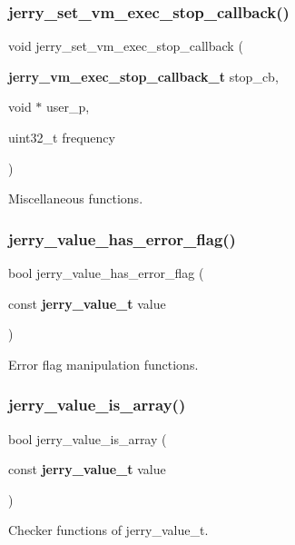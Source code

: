 \subsubsection{jerry\_set\_vm\_exec\_stop\_callback()}
{\footnotesize\ttfamily void jerry\+\_\+set\+\_\+vm\+\_\+exec\+\_\+stop\+\_\+callback (\begin{DoxyParamCaption}\item[{\textbf{ jerry\+\_\+vm\+\_\+exec\+\_\+stop\+\_\+callback\+\_\+t}}]{stop\+\_\+cb,  }\item[{void $\ast$}]{user\+\_\+p,  }\item[{uint32\+\_\+t}]{frequency }\end{DoxyParamCaption})}

Miscellaneous functions. \mbox{\label{group___core_gaef47c2c240bdf60611702fd3d440e203}} 
\subsubsection{jerry\_value\_has\_error\_flag()}
{\footnotesize\ttfamily bool jerry\+\_\+value\+\_\+has\+\_\+error\+\_\+flag (\begin{DoxyParamCaption}\item[{const \textbf{ jerry\+\_\+value\+\_\+t}}]{value }\end{DoxyParamCaption})}

Error flag manipulation functions. \mbox{\label{group___core_ga37f7d3ebd6d12c82e16aed3ec9785db8}} 
\subsubsection{jerry\_value\_is\_array()}
{\footnotesize\ttfamily bool jerry\+\_\+value\+\_\+is\+\_\+array (\begin{DoxyParamCaption}\item[{const \textbf{ jerry\+\_\+value\+\_\+t}}]{value }\end{DoxyParamCaption})}

Checker functions of \textquotesingle{}jerry\+\_\+value\+\_\+t\textquotesingle{}. \mbox{\label{group___core_ga648a332bebb2237e8d08756944ea10b6}} 

